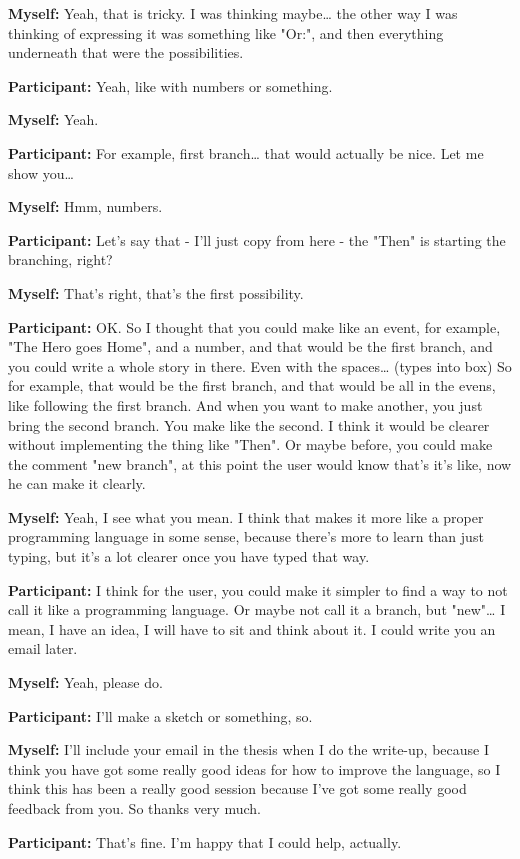 \documentclass[11pt]{report}
\begin{document}
\begin{linenumbers}
\textbf{Myself:} Yeah, that is tricky. I was thinking maybe\ldots{} the other way I was thinking of expressing it was something like "Or:", and then everything underneath that were the possibilities.

\textbf{Participant:} Yeah, like with numbers or something.

\textbf{Myself:} Yeah.

\textbf{Participant:} For example, first branch\ldots{} that would actually be nice. Let me show you\ldots{}

\textbf{Myself:} Hmm, numbers.

\textbf{Participant:} Let's say that - I'll just copy from here - the "Then" is starting the branching, right?

\textbf{Myself:} That's right, that's the first possibility.

\textbf{Participant:} OK. So I thought that you could make like an event, for example, "The Hero goes Home", and a number, and that would be the first branch, and you could write a whole story in there. Even with the spaces\ldots{} (types into box) So for example, that would be the first branch, and that would be all in the evens, like following the first branch. And when you want to make another, you just bring the second branch. You make like the second. I think it would be clearer without implementing the thing like "Then". Or maybe before, you could make the comment "new branch", at this point the user would know that's it's like, now he can make it clearly.

\textbf{Myself:} Yeah, I see what you mean. I think that makes it more like a proper programming language in some sense, because there's more to learn than just typing, but it's a lot clearer once you have typed that way.

\textbf{Participant:} I think for the user, you could make it simpler to find a way to not call it like a programming language. Or maybe not call it a branch, but "new"\ldots{} I mean, I have an idea, I will have to sit and think about it. I could write you an email later.

\textbf{Myself:} Yeah, please do.

\textbf{Participant:} I'll make a sketch or something, so.

\textbf{Myself:} I'll include your email in the thesis when I do the write-up, because I think you have got some really good ideas for how to improve the language, so I think this has been a really good session because I've got some really good feedback from you. So thanks very much.

\textbf{Participant:} That's fine. I'm happy that I could help, actually.

\end{linenumbers}
\resetlinenumber[1]
\end{document}
